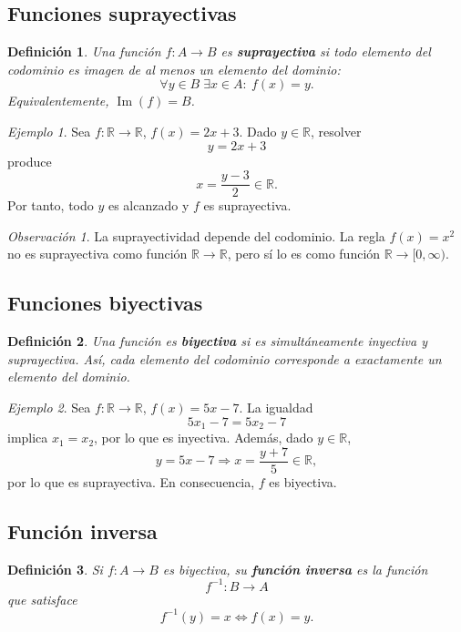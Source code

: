 \documentclass[12pt]{article}
\newtheorem{definicion}{Definición}[section]
\theoremstyle{remark}
\newtheorem{observacion}{Observación}[section]
\newtheorem{ejemplo}{Ejemplo}[section]
\begin{document}
\subsection*{Funciones suprayectivas}
\begin{definicion}
Una función $f:A\to B$ es \textbf{suprayectiva} si todo elemento del codominio es imagen de al menos un elemento del dominio:
\[
\boxed{\forall y\in B\;\exists x\in A:\ f(x)=y.}
\]
Equivalentemente, $\operatorname{Im}(f)=B$.
\end{definicion}

\begin{ejemplo}
Sea $f:\mathbb R\to\mathbb R$, $f(x)=2x+3$. Dado $y\in\mathbb R$, resolver
\[
y=2x+3
\]
produce
\[
x=\frac{y-3}{2}\in\mathbb R.
\]
Por tanto, todo $y$ es alcanzado y $f$ es suprayectiva.
\end{ejemplo}

\begin{observacion}
La suprayectividad depende del codominio. La regla $f(x)=x^2$ no es suprayectiva como función $\mathbb R\to\mathbb R$, pero sí lo es como función $\mathbb R\to[0,\infty)$.
\end{observacion}
\subsection*{Funciones biyectivas}
\begin{definicion}
Una función es \textbf{biyectiva} si es simultáneamente inyectiva y suprayectiva. Así, cada elemento del codominio corresponde a exactamente un elemento del dominio.
\end{definicion}

\begin{ejemplo}
Sea $f:\mathbb R\to\mathbb R$, $f(x)=5x-7$. La igualdad
\[
5x_1-7=5x_2-7
\]
implica $x_1=x_2$, por lo que es inyectiva. Además, dado $y\in\mathbb R$,
\[
y=5x-7\Longrightarrow x=\frac{y+7}{5}\in\mathbb R,
\]
por lo que es suprayectiva. En consecuencia, $f$ es biyectiva.
\end{ejemplo}
\subsection*{Función inversa}
\begin{definicion}
Si $f:A\to B$ es biyectiva, su \textbf{función inversa} es la función
\[
f^{-1}:B\to A
\]
que satisface
\[
f^{-1}(y)=x\Longleftrightarrow f(x)=y.
\]
\end{definicion}
\end{document}
